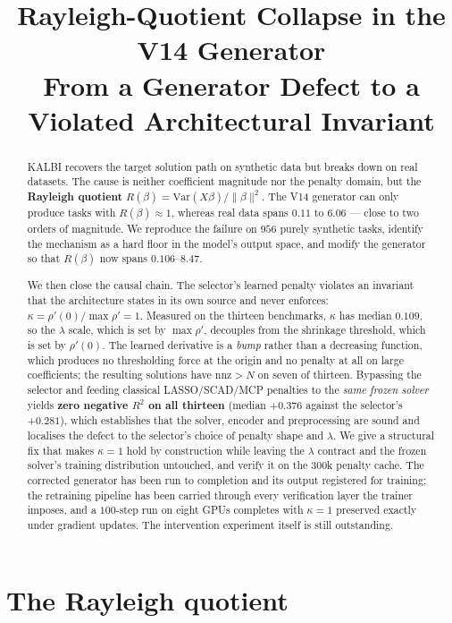 \documentclass[11pt]{article}
\title{Rayleigh-Quotient Collapse in the V14 Generator\\[2mm]
\large From a Generator Defect to a Violated Architectural Invariant}
\author{}
\date{}
\newcommand{\Rq}{R(\beta)}
\begin{document}
\maketitle

\begin{abstract}
KALBI recovers the target solution path on synthetic data but breaks down on
real datasets. The cause is neither coefficient magnitude nor the penalty
domain, but the \textbf{Rayleigh quotient}
$\Rq = \mathrm{Var}(X\beta)/\|\beta\|^2$.
The V14 generator can only produce tasks with $\Rq \approx 1$, whereas real
data spans $0.11$ to $6.06$ --- close to two orders of magnitude.
We reproduce the failure on $956$ purely synthetic tasks, identify the
mechanism as a hard floor in the model's output space, and modify the
generator so that $\Rq$ now spans $0.106$--$8.47$.

We then close the causal chain. The selector's learned penalty violates an
invariant that the architecture states in its own source and never enforces:
$\kappa = \rho'(0)/\max\rho' = 1$. Measured on the thirteen benchmarks,
$\kappa$ has median $0.109$, so the $\lambda$ scale, which is set by
$\max\rho'$, decouples from the shrinkage threshold, which is set by
$\rho'(0)$. The learned derivative is a \emph{bump} rather than a decreasing
function, which produces no thresholding force at the origin and no penalty at
all on large coefficients; the resulting solutions have $\mathrm{nnz} > N$ on
seven of thirteen. Bypassing the selector and feeding classical
LASSO/SCAD/MCP penalties to the \emph{same frozen solver} yields
\textbf{zero negative $R^2$ on all thirteen} (median $+0.376$ against the
selector's $+0.281$), which establishes that the solver, encoder and
preprocessing are sound and localises the defect to the selector's choice of
penalty shape and $\lambda$. We give a structural fix that makes $\kappa = 1$
hold by construction while leaving the $\lambda$ contract and the frozen
solver's training distribution untouched, and verify it on the $300$k penalty
cache. The corrected generator has been run to completion and its output
registered for training; the retraining pipeline has been carried through every
verification layer the trainer imposes, and a $100$-step run on eight GPUs
completes with $\kappa = 1$ preserved exactly under gradient updates. The
intervention experiment itself is still outstanding.
\end{abstract}

\section{The Rayleigh quotient}
\end{document}
